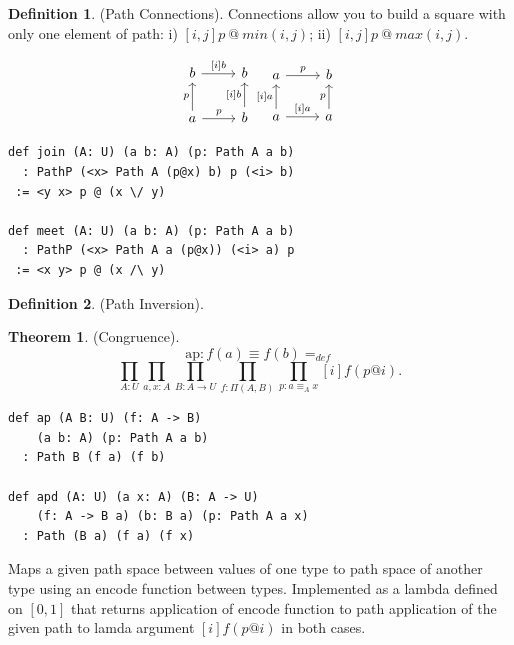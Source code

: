 \documentclass{article}
\theoremstyle{definition}
\newtheorem{definition}{Definition}
\newtheorem{theorem}{Theorem}
\begin{document}
\newpage

\begin{definition} (Path Connections).
Connections allow you to build a square
with only one element of path: i) $[i,j] p\ @\ min(i,j)$;
ii) $[i,j] p\ @\ max(i,j)$.

\[
\begin{array}{cc}
  \begin{tikzcd}
    b \arrow[r, "{[i]b}"] & b \\
    a \arrow[u, "p"] \arrow[r, "p"] & b \arrow[u, "{[i]b}"]
  \end{tikzcd}
  \begin{tikzcd}
    a \arrow[r, "p"] & b \\
    a \arrow[u, "{[i]a}"] \arrow[r, "{[i]a}"] & a \arrow[u, "p"]
  \end{tikzcd}
\end{array}
\]

\begin{lstlisting}[mathescape=true]
def join (A: U) (a b: A) (p: Path A a b)
  : PathP (<x> Path A (p@x) b) p (<i> b)
 := <y x> p @ (x \/ y)

def meet (A: U) (a b: A) (p: Path A a b)
  : PathP (<x> Path A a (p@x)) (<i> a) p
 := <x y> p @ (x /\ y)
\end{lstlisting}
\end{definition}

\begin{definition} (Path Inversion).
\end{definition}

\begin{theorem} (Congruence).
$$
\mathrm{ap} : f(a)\equiv f(b) =_{def}
$$
$$
  \prod_{A:U}\prod_{a,x:A}\prod_{B:A\rightarrow U}\prod_{f: \Pi(A,B)}\prod_{p:a\equiv_A x}[i] f(p@i).
$$
\begin{lstlisting}[mathescape=true]
def ap (A B: U) (f: A -> B)
    (a b: A) (p: Path A a b)
  : Path B (f a) (f b)

def apd (A: U) (a x: A) (B: A -> U)
    (f: A -> B a) (b: B a) (p: Path A a x)
  : Path (B a) (f a) (f x)
\end{lstlisting}
\end{theorem}

Maps a given path space between values of one type
to path space of another type using an encode function between types.
Implemented as a lambda defined on $[0,1]$ that returns
application of encode function to path application of
the given path to lamda argument $[i]f (p @ i)$
in both cases.
\end{document}
